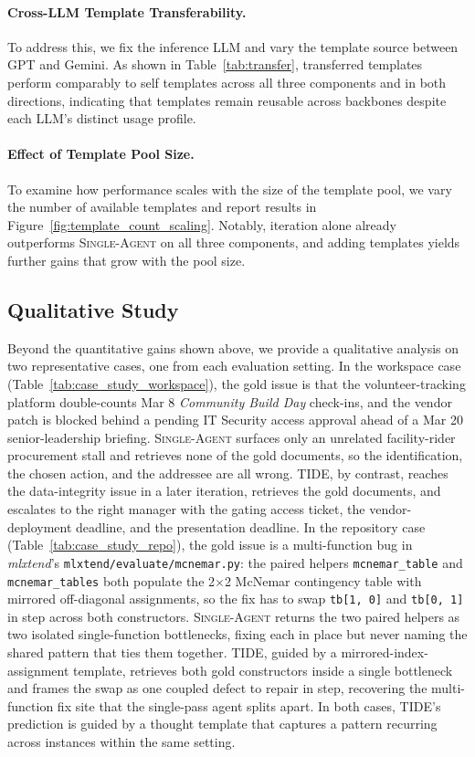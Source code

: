 \paragraph{Cross-LLM Template Transferability.}
To address this, we fix the inference LLM and vary the template source between GPT and Gemini.
As shown in Table~\ref{tab:transfer}, transferred templates perform comparably to self templates across all three components and in both directions, indicating that templates remain reusable across backbones despite each LLM's distinct usage profile.

\paragraph{Effect of Template Pool Size.}
To examine how performance scales with the size of the template pool, we vary the number of available templates and report results in Figure~\ref{fig:template_count_scaling}.
Notably, iteration alone already outperforms \textsc{Single-Agent} on all three components, and adding templates yields further gains that grow with the pool size.



\subsection{Qualitative Study}
Beyond the quantitative gains shown above, we provide a qualitative analysis on two representative cases, one from each evaluation setting.
In the workspace case (Table~\ref{tab:case_study_workspace}), the gold issue is that the volunteer-tracking platform double-counts Mar 8 \textit{Community Build Day} check-ins, and the vendor patch is blocked behind a pending IT Security access approval ahead of a Mar 20 senior-leadership briefing. \textsc{Single-Agent} surfaces only an unrelated facility-rider procurement stall and retrieves none of the gold documents, so the identification, the chosen action, and the addressee are all wrong. \textsc{TIDE}, by contrast, reaches the data-integrity issue in a later iteration, retrieves the gold documents, and escalates to the right manager with the gating access ticket, the vendor-deployment deadline, and the presentation deadline.
In the repository case (Table~\ref{tab:case_study_repo}), the gold issue is a multi-function bug in \textit{mlxtend}'s \texttt{mlxtend/evaluate/mcnemar.py}: the paired helpers \texttt{mcnemar\_table} and \texttt{mcnemar\_tables} both populate the 2$\times$2 McNemar contingency table with mirrored off-diagonal assignments, so the fix has to swap \texttt{tb[1, 0]} and \texttt{tb[0, 1]} in step across both constructors. \textsc{Single-Agent} returns the two paired helpers as two isolated single-function bottlenecks, fixing each in place but never naming the shared pattern that ties them together. \textsc{TIDE}, guided by a mirrored-index-assignment template, retrieves both gold constructors inside a single bottleneck and frames the swap as one coupled defect to repair in step, recovering the multi-function fix site that the single-pass agent splits apart.
In both cases, \textsc{TIDE}'s prediction is guided by a thought template that captures a pattern recurring across instances within the same setting.
